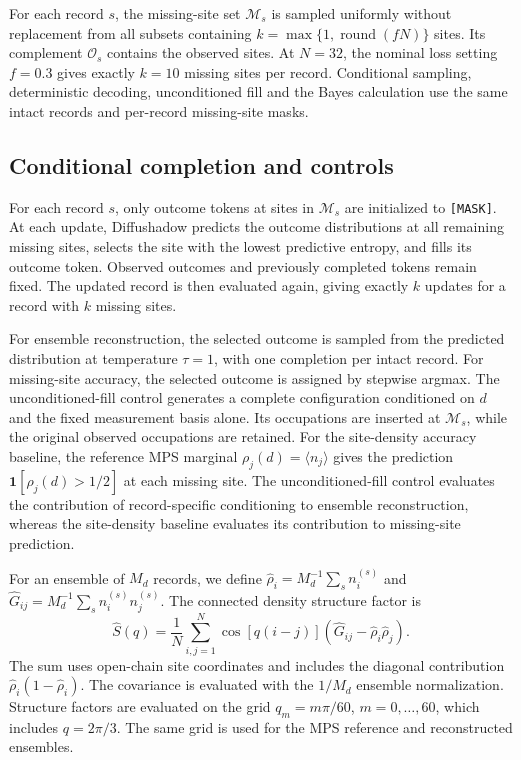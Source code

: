 \documentclass[11pt,a4paper]{article}
\newcommand{\TBD}[1]{\textcolor{red!70!black}{\textsf{[TBD: #1]}}}
\newcommand{\ind}{\mathbf{1}}
\newcommand{\subhead}[1]{\subsection*{#1}}
\begin{document}
For each record $s$, the missing-site set $\mathcal{M}_s$ is sampled
uniformly without replacement from all subsets containing
$k=\max\{1,\operatorname{round}(fN)\}$ sites. Its complement
$\mathcal{O}_s$ contains the observed sites. At $N=32$, the nominal
loss setting $f=0.3$ gives exactly $k=10$ missing sites per record.
Conditional sampling, deterministic decoding, unconditioned fill
and the Bayes calculation use the same intact records and
per-record missing-site masks.

\subhead{Conditional completion and controls}
For each record $s$, only outcome tokens at sites in
$\mathcal{M}_s$ are initialized to \texttt{[MASK]}. At each update,
Diffushadow predicts the outcome distributions at all remaining
missing sites, selects the site with the lowest predictive entropy,
and fills its outcome token. Observed outcomes and previously
completed tokens remain fixed. The updated record is then evaluated
again, giving exactly $k$ updates for a record with $k$ missing sites.

For ensemble reconstruction, the selected outcome is sampled from
the predicted distribution at temperature $\tau=1$, with one
completion per intact record. For missing-site accuracy, the selected
outcome is assigned by stepwise argmax. The unconditioned-fill control
generates a complete configuration conditioned on $d$ and the fixed
measurement basis alone. Its occupations are inserted at
$\mathcal{M}_s$, while the original observed occupations are retained.
For the site-density accuracy baseline, the reference MPS marginal
$\rho_j(d)=\langle n_j\rangle$ gives the prediction
$\ind[\rho_j(d)>1/2]$ at each missing site. The unconditioned-fill
control evaluates the contribution of record-specific conditioning
to ensemble reconstruction, whereas the site-density baseline
evaluates its contribution to missing-site prediction.

For an ensemble of $M_d$ records, we define
$\widehat{\rho}_i=M_d^{-1}\sum_s n_i^{(s)}$ and
$\widehat{G}_{ij}=M_d^{-1}\sum_s n_i^{(s)}n_j^{(s)}$.
The connected density structure factor is
\begin{equation}
\widehat{S}(q)
=
\frac{1}{N}\sum_{i,j=1}^{N}\cos[q(i-j)]
\left(
\widehat{G}_{ij}-\widehat{\rho}_i\widehat{\rho}_j
\right).
\label{supp:eq:ryd_sf}
\end{equation}
The sum uses open-chain site coordinates and includes the diagonal
contribution $\widehat{\rho}_i(1-\widehat{\rho}_i)$.
The covariance is evaluated with the $1/M_d$ ensemble normalization.
Structure factors are evaluated on the grid
$q_m=m\pi/60$, $m=0,\ldots,60$, which includes $q=2\pi/3$.
The same grid is used for the MPS reference and reconstructed ensembles.
\end{document}
